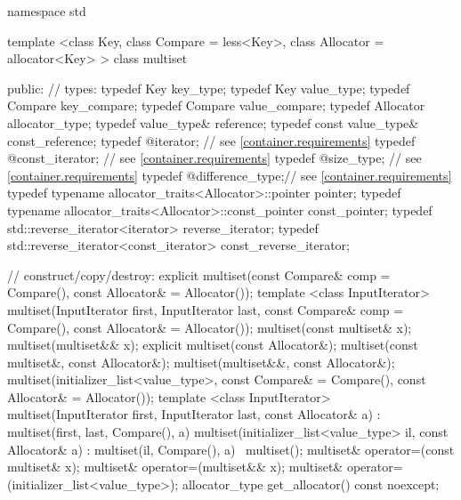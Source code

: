 \begin{codeblock}
namespace std {
  template <class Key, class Compare = less<Key>,
            class Allocator = allocator<Key> >
  class multiset {
  public:
    // types:
    typedef Key                                                     key_type;
    typedef Key                                                     value_type;
    typedef Compare                                                 key_compare;
    typedef Compare                                                 value_compare;
    typedef Allocator                                               allocator_type;
    typedef value_type&                                             reference;
    typedef const value_type&                                       const_reference;
    typedef @\impdef@                iterator;       // see \ref{container.requirements}
    typedef @\impdef@                const_iterator; // see \ref{container.requirements}
    typedef @\impdef@                size_type;      // see \ref{container.requirements}
    typedef @\impdef@                difference_type;// see \ref{container.requirements}
    typedef typename allocator_traits<Allocator>::pointer           pointer;
    typedef typename allocator_traits<Allocator>::const_pointer     const_pointer;
    typedef std::reverse_iterator<iterator>       reverse_iterator;
    typedef std::reverse_iterator<const_iterator> const_reverse_iterator;

    // construct/copy/destroy:
    explicit multiset(const Compare& comp = Compare(),
                      const Allocator& = Allocator());
    template <class InputIterator>
      multiset(InputIterator first, InputIterator last,
               const Compare& comp = Compare(),
               const Allocator& = Allocator());
    multiset(const multiset& x);
    multiset(multiset&& x);
    explicit multiset(const Allocator&);
    multiset(const multiset&, const Allocator&);
    multiset(multiset&&, const Allocator&);
    multiset(initializer_list<value_type>,
      const Compare& = Compare(),
      const Allocator& = Allocator());
    template <class InputIterator>
    multiset(InputIterator first, InputIterator last, const Allocator& a)
      : multiset(first, last, Compare(), a) { }
    multiset(initializer_list<value_type> il, const Allocator& a)
      : multiset(il, Compare(), a) { }
   ~multiset();
    multiset& operator=(const multiset& x);
    multiset& operator=(multiset&& x);
    multiset& operator=(initializer_list<value_type>);
    allocator_type get_allocator() const noexcept;

}}
\end{codeblock}
